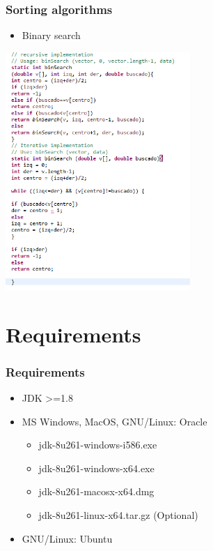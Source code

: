 \documentclass[11pt]{beamer}
\begin{document}
\begin{frame}
\frametitle{Sorting algorithms}
\begin{itemize}
\item Binary search
\end{itemize}
\begin{center}
\includegraphics[width=7.0cm]{img/binaria (2).png}
\end{center}
\end{frame}

\section{Requirements}
\begin{frame}
\frametitle{Requirements}
\begin{itemize}
\item JDK >=1.8
\item MS Windows, MacOS, GNU/Linux: Oracle
\begin{itemize}
\item jdk-8u261-windows-i586.exe
\item jdk-8u261-windows-x64.exe
\item jdk-8u261-macosx-x64.dmg
\item jdk-8u261-linux-x64.tar.gz (Optional)
\end{itemize}
\item GNU/Linux: Ubuntu 
\end{itemize}
\end{frame}
\end{document}
